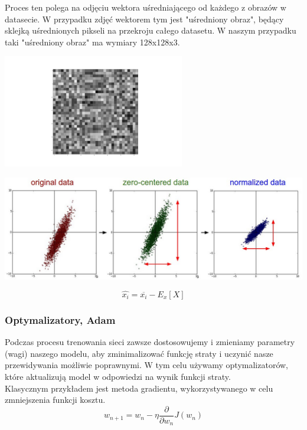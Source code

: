 \documentclass[12pt,a4paper]{article}
\begin{document}
    Proces ten polega na odjęciu wektora uśredniającego od każdego z obrazów w datasecie. W przypadku zdjęć wektorem tym jest "uśredniony obraz", będący sklejką uśrednionych pikseli na przekroju całego datasetu. W naszym przypadku taki "uśredniony obraz" ma wymiary 128x128x3.
    \begin{center}
    	\includegraphics[scale=1]{mean-image.png}
    \end{center}
    \begin{center}
    	\includegraphics[scale=0.45]{zero-center.jpeg}
    	
    \end{center}
    $$\widehat{x_{i}}=\overline{x_{i}}-E_{x}\left[X\right]$$
    \subsubsection{Optymalizatory, Adam}
    
    Podczas procesu trenowania sieci zawsze dostosowujemy i zmieniamy parametry (wagi) naszego modelu, aby zminimalizować funkcję straty i uczynić nasze przewidywania możliwie poprawnymi. W tym celu używamy optymalizatorów, które aktualizują model w odpowiedzi na wynik funkcji straty.
    \\
    
    Klasycznym przykładem jest metoda gradientu, wykorzystywanego w celu zmniejszenia funkcji kosztu.
    $$w_{n+1} = w_{n} - \eta \frac{\partial}{\partial w_{n}}J(w_{n})$$
    \\
    
\end{document}
